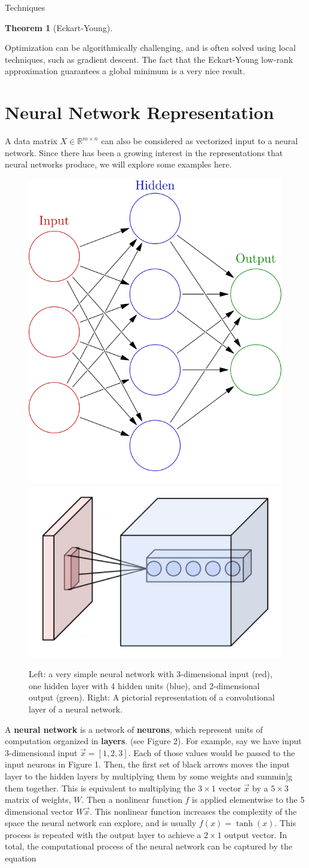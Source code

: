 \documentclass[12pt]{pom_thesis}
\newtheorem{theorem}{Theorem}
\begin{document}
\begin{chapter}{Techniques}
\begin{theorem}[Eckart-Young]
\end{theorem}
Optimization can be algorithmically challenging, and is often solved using local techniques, such as gradient descent. The fact that the Eckart-Young low-rank approximation guarantees a global minimum is a very nice result. 
\section{Neural Network Representation}
A data matrix $X \in \mathbb{R}^{m \times n}$ can also be considered as vectorized input to a neural network. Since there has been a growing interest in the representations that neural networks produce, we will explore some examples here.  
\begin{figure}[h]
	\centering
	\includegraphics[width=.3\textwidth]{nn}
	\includegraphics[width=.5\textwidth]{Conv_layer}
	\caption{Left: a very simple neural network with 3-dimensional input (red),  one hidden layer with 4 hidden units (blue),  and 2-dimensional output (green). Right: A pictorial representation of a convolutional layer of a neural network.}
\end{figure}
A \textbf{neural network} is a network of \textbf{neurons}, which represent units of computation organized in \textbf{layers}. (see Figure 2). For example, say we have input 3-dimensional input $\vec{x} = [1,2,3] $. Each of those values would be passed to the input neurons in Figure 1. Then, the first set of black arrows moves the input layer to the hidden layers by multiplying them by some weights and summin]g them together. This is equivalent to multiplying the $3 \times 1$ vector $\vec{x}$ by a $5 \times 3$ matrix of weights, $W$. Then a nonlinear function $f$ is applied elementwise to the 5 dimensional vector $W\vec{x}$. This nonlinear function increases the complexity of the space the neural network can explore, and is usually $f(x) = \tanh(x)$. This process is repeated with the output layer to achieve a $2\times 1$ output vector. In total, the computational process of the neural network can be captured by the equation

\end{chapter}
\end{document}
